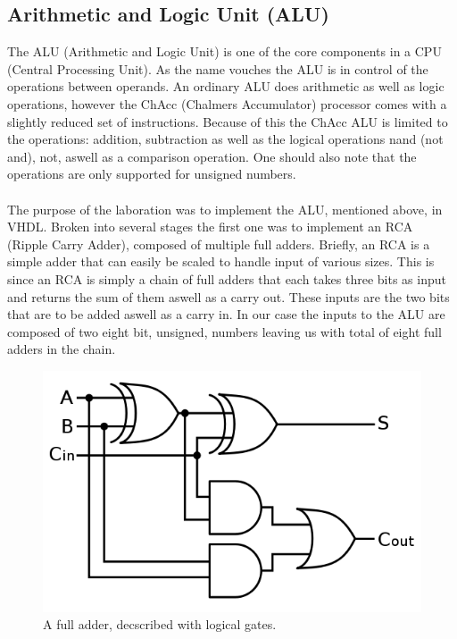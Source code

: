 \documentclass[a4paper,11pt]{article}
\begin{document}
\subsection{Arithmetic and Logic Unit (ALU)}
The ALU (Arithmetic and Logic Unit) is one of the core components in a CPU 
(Central Processing Unit). As the name vouches the ALU is in control of the 
operations between operands. An ordinary ALU does arithmetic as well as logic 
operations, however the ChAcc (Chalmers Accumulator) processor comes with a 
slightly reduced set of instructions. Because of this the ChAcc ALU is limited 
to the operations: addition, subtraction as well as the logical operations nand 
(not and), not, aswell as a comparison operation. One should also note that 
the operations are only supported for unsigned numbers.\\\\
\noindent
The purpose of the laboration was to implement the ALU, mentioned above, in 
VHDL. Broken into several stages the first one was to implement an RCA (Ripple 
Carry Adder), composed of multiple full adders. Briefly, an RCA is a simple 
adder that can easily be scaled to handle input of various sizes. This is since 
an RCA is simply a chain of full adders that each takes three bits as input 
and returns the sum of them aswell as a carry out. These inputs are the two 
bits that are to be added aswell as a carry in. In our case the inputs to the 
ALU are composed of two eight bit, unsigned, numbers leaving us with total 
of eight full adders in the chain.

\begin{figure}[h]
    \centering
    \includegraphics[scale=0.25]{FA.png}
    \caption{A full adder, decscribed with logical gates.}
    \label{FA}
\end{figure}
\end{document}
